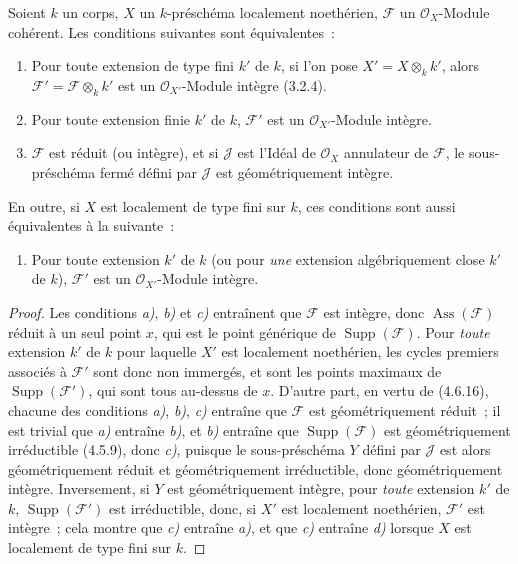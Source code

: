 \begin{proposition}[4.6.18]
\label{IV.2.4.6.18-fr}
Soient $k$ un corps, $X$ un $k$-préschéma localement noethérien, $\mathscr F$
un $\mathcal O_X$-Module cohérent. Les conditions suivantes sont
équivalentes~:
\begin{enumerate}
\item[\textup{a)}] Pour toute extension de type fini $k'$ de $k$, si l'on pose
$X'=X\otimes_k k'$, alors $\mathscr F'=\mathscr F\otimes_k k'$ est un
$\mathcal O_{X'}$-Module intègre \textup{(3.2.4)}.
\item[\textup{b)}] Pour toute extension finie $k'$ de $k$, $\mathscr F'$ est un
$\mathcal O_{X'}$-Module intègre.
\item[\textup{c)}] $\mathscr F$ est réduit (ou intègre), et si $\mathscr J$ est
l'Idéal de $\mathcal O_X$ annulateur de $\mathscr F$, le sous-préschéma fermé
défini par $\mathscr J$ est géométriquement intègre.
\end{enumerate}
En outre, si $X$ est localement de type fini sur $k$, ces conditions sont aussi
équivalentes à la suivante~:
\begin{enumerate}
\item[\textup{d)}] Pour toute extension $k'$ de $k$ \textup{(ou} pour \emph{une} extension
algébriquement close $k'$ de $k$), $\mathscr F'$ est un
$\mathcal O_{X'}$-Module intègre.
\end{enumerate}
\end{proposition}

\begin{proof}
Les conditions \emph{a)}, \emph{b)} et \emph{c)} entraînent que $\mathscr F$ est intègre, donc
$\operatorname{Ass}(\mathscr F)$ réduit à un seul point $x$, qui est le point
générique de $\operatorname{Supp}(\mathscr F)$. Pour \emph{toute} extension $k'$ de
$k$ pour laquelle $X'$ est localement noethérien, les cycles premiers associés
à $\mathscr F'$ sont donc non immergés, et sont les points maximaux de
$\operatorname{Supp}(\mathscr F')$, qui sont tous au-dessus de $x$. D'autre
part, en vertu de (4.6.16), chacune des conditions \emph{a)}, \emph{b)}, \emph{c)} entraîne que
$\mathscr F$ est géométriquement réduit~; il est trivial que \emph{a)} entraîne \emph{b)},
et \emph{b)} entraîne que $\operatorname{Supp}(\mathscr F)$ est géométriquement
irréductible (4.5.9), donc \emph{c)}, puisque le sous-préschéma $Y$ défini
par $\mathscr J$ est alors géométriquement réduit et géométriquement
irréductible, donc géométriquement intègre. Inversement, si $Y$ est
géométriquement intègre, pour \emph{toute} extension $k'$ de $k$,
$\operatorname{Supp}(\mathscr F')$ est irréductible, donc, si $X'$ est
localement noethérien, $\mathscr F'$ est intègre~; cela montre que \emph{c)} entraîne
\emph{a)}, et que \emph{c)} entraîne \emph{d)} lorsque $X$ est localement de type fini sur $k$.
\end{proof}

